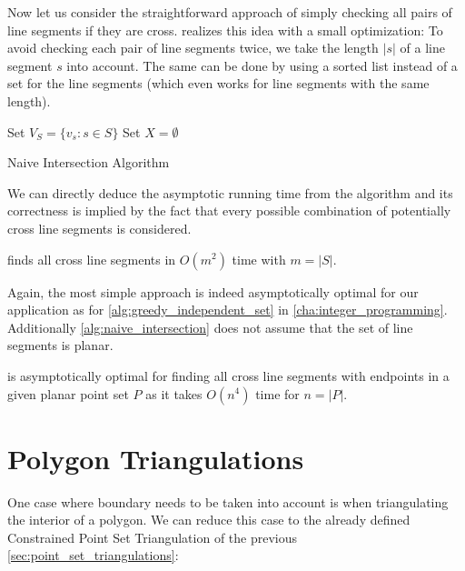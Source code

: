 Now let us consider the straightforward approach of simply checking
all pairs of line segments if they are \gls{cross}. 
 realizes this idea with a small
optimization: To avoid checking each pair of line segments twice, we
take the length \(|s|\) of a line segment \(s\) into account. The same
can be done by using a sorted list instead of a set for the line
segments (which even works for line segments with the same length).

\begin{algorithm}
  \DontPrintSemicolon
  
  
  Set \(V_S = \{v_s : s \in S\} \) \;
  Set \(X = \emptyset\) \;
  \caption{\label{alg:naive_intersection}Naive Intersection Algorithm}
\end{algorithm}

We can directly deduce the asymptotic running time from the algorithm
and its correctness is implied by the fact that every possible
combination of potentially \gls{cross} line segments is considered.

\begin{theorem}
   finds all \gls{cross} line segments
  in \(O(m^2)\) time with \(m = |S|\).  
\end{theorem}

Again, the most simple approach is indeed asymptotically optimal for
our application as for \cref{alg:greedy_independent_set} in
\cref{cha:integer_programming}. Additionally
\cref{alg:naive_intersection} does not assume that the set of line
segments is planar.

\begin{theorem}
   is asymptotically optimal
  for finding all \gls{cross} line segments
  with endpoints in a given planar point set \(P\)
  as it takes \(O(n^4)\) time for \(n = |P|\).
\end{theorem}

\section{Polygon Triangulations}
One case where boundary needs to be taken into account is when
triangulating the interior of a polygon. We can reduce this case to
the already defined Constrained Point Set Triangulation of the
previous \cref{sec:point_set_triangulations}:

